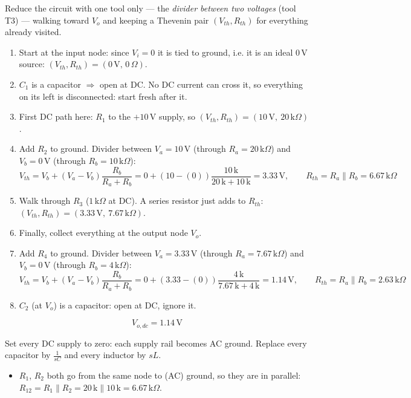 \documentclass[11pt]{article}
\newcommand{\solstep}[2]{\par\medskip{\color{stepc}\textbf{Step #1 --- #2}}\par\nopagebreak}
\begin{document}
Reduce the circuit with one tool only --- the \emph{divider between two voltages} (tool T3) --- walking toward $V_o$ and keeping a Thevenin pair $(V_{th},R_{th})$ for everything already visited.
\begin{enumerate}[leftmargin=*,itemsep=2pt]
\item Start at the input node: since $V_i=0$ it is tied to ground, i.e. it is an ideal $0\,\mathrm{V}$ source: $(V_{th},R_{th})=(0\,\mathrm{V},\,0\,\Omega)$.
\item $C_{1}$ is a capacitor $\Rightarrow$ open at DC. No DC current can cross it, so everything on its left is disconnected: start fresh after it.
\item First DC path here: $R_{1}$ to the $+10\,\mathrm{V}$ supply, so $(V_{th},R_{th}) = (10\,\mathrm{V},\ 20\,\mathrm{k}\Omega)$.
\item Add $R_{2}$ to ground. Divider between $V_a=10\,\mathrm{V}$ (through $R_a=20\,\mathrm{k}\Omega$) and $V_b=0\,\mathrm{V}$ (through $R_b=10\,\mathrm{k}\Omega$):\[
V_{th} = V_b + (V_a-V_b)\frac{R_b}{R_a+R_b} = 0 + \left(10 - (0)\right)\frac{10\,\mathrm{k}}{20\,\mathrm{k} + 10\,\mathrm{k}} = 3.33\,\mathrm{V},\qquad R_{th} = R_a\parallel R_b = 6.67\,\mathrm{k}\Omega
\]

\item Walk through $R_{3}$ ($1\,\mathrm{k}\Omega$ at DC). A series resistor just adds to $R_{th}$: $(V_{th},R_{th}) = (3.33\,\mathrm{V},\ 7.67\,\mathrm{k}\Omega)$.
\item Finally, collect everything at the output node $V_o$.
\item Add $R_{4}$ to ground. Divider between $V_a=3.33\,\mathrm{V}$ (through $R_a=7.67\,\mathrm{k}\Omega$) and $V_b=0\,\mathrm{V}$ (through $R_b=4\,\mathrm{k}\Omega$):\[
V_{th} = V_b + (V_a-V_b)\frac{R_b}{R_a+R_b} = 0 + \left(3.33 - (0)\right)\frac{4\,\mathrm{k}}{7.67\,\mathrm{k} + 4\,\mathrm{k}} = 1.14\,\mathrm{V},\qquad R_{th} = R_a\parallel R_b = 2.63\,\mathrm{k}\Omega
\]

\item $C_{2}$ (at $V_{o}$) is a capacitor: open at DC, ignore it.
\end{enumerate}

\[
\boxed{V_{o,dc} = 1.14\,\mathrm{V}}
\]

\solstep{3}{AC circuit}Set every DC supply to zero: each supply rail becomes AC ground. Replace every capacitor by $\frac{1}{sC}$ and every inductor by $sL$.
\begin{itemize}[leftmargin=*,itemsep=2pt]
\item $R_{1}$, $R_{2}$ both go from the same node to (AC) ground, so they are in parallel: $R_{12} = R_{1} \parallel R_{2} = 20\,\mathrm{k} \parallel 10\,\mathrm{k} = 6.67\,\mathrm{k}\Omega$.
\end{itemize}
\end{document}
